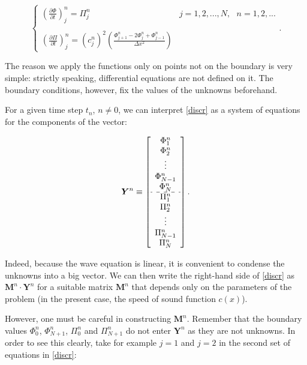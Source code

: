 \documentclass{article}
\begin{document}
\begin{equation}\label{discr}
\left\{\begin{array}{cc}
\displaystyle\left(\frac{\partial\Phi}{\partial t}\right)^n_j=\Pi^n_j&j=1,2,...,N,\text{ }n=1,2,...\\
\text{ }&\text{ }\\
\displaystyle\left(\frac{\partial \Pi}{\partial t}\right)^n_j=\left(c^n_j\right)^2\left(\frac{\Phi^n_{j+1}-2\Phi^n_j+\Phi^n_{j-1}}{\Delta x^2}\right)&\text{ }
\end{array}\right..
\end{equation}

The reason we apply the functions only on points not on the boundary is very simple: strictly speaking, differential equations are not defined on it. The boundary conditions, however, fix the values of the unknowns beforehand.

For a given time step $t_n$, $n\neq0$, we can interpret \eqref{discr} as a system of equations for the components of the vector:

\begin{equation}\label{Y}
\bm{Y}^n\equiv\left[\begin{array}{c}
\Phi^n_1\\
\Phi^n_2\\
\vdots\\
\Phi^n_{N-1}\\
\Phi^n_N\\
\hdashline
\Pi^n_1\\
\Pi^n_2\\
\vdots\\
\Pi^n_{N-1}\\
\Pi^n_N\\
\end{array}\right].
\end{equation}

Indeed, because the wave equation is linear, it is convenient to condense the unknowns into a big vector. We can then write the right-hand side of \eqref{discr} as $\bm{M}^n\cdot\bm{Y}^n$ for a suitable matrix $\bm{M}^n$ that depends only on the parameters of the problem (in the present case, the speed of sound function $c(x)$).

However, one must be careful in constructing $\bm{M}^n$. Remember that the boundary values $\Phi^n_0$, $\Phi^n_{N+1}$, $\Pi^n_0$ and $\Pi^n_{N+1}$ do not enter $\bm{Y}^n$ as they are not unknowns. In order to see this clearly, take for example $j=1$ and $j=2$ in the second set of equations in \eqref{discr}:
\end{document}
